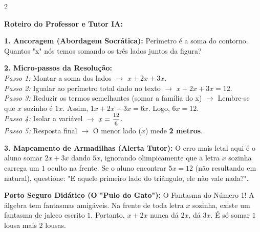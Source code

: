 \begin{multicols*}{2}
\ifgabarito
    \begin{tcolorbox}[colback=CorTitUm!5, colframe=CorTitUm, boxrule=1pt, arc=4pt, left=6pt, right=6pt, top=6pt, bottom=6pt]
    \small\textbf{\textcolor{CorTitUm}{Roteiro do Professor e Tutor IA:}}\par\vspace{0.1cm}
    \color{CinzaEscuro}
    \textbf{1. Ancoragem (Abordagem Socrática):} Perímetro é a soma do contorno. Quantos "x" nós temos somando os três lados juntos da figura?\par\vspace{0.1cm}
    
    \textbf{2. Micro-passos da Resolução:}\\
    \textit{Passo 1:} Montar a soma dos lados $\rightarrow$ $ x + 2x + 3x $.\\
    \textit{Passo 2:} Igualar ao perímetro total dado no texto $\rightarrow$ $ x + 2x + 3x = 12 $.\\
    \textit{Passo 3:} Reduzir os termos semelhantes (somar a família do x) $\rightarrow$ Lembre-se que $x$ sozinho é $1x$. Assim, $1x + 2x + 3x = 6x$. Logo, $ 6x = 12 $.\\
    \textit{Passo 4:} Isolar a variável $\rightarrow$ $ x = \mfrac{12}{6} $.\\
    \textit{Passo 5:} Resposta final $\rightarrow$ O menor lado ($x$) mede \textbf{2 metros}.\par\vspace{0.1cm}
    
    \textbf{3. Mapeamento de Armadilhas (Alerta Tutor):} O erro mais letal aqui é o aluno somar $2x + 3x$ dando $5x$, ignorando olimpicamente que a letra $x$ sozinha carrega um $1$ oculto na frente. Se o aluno encontrar $5x=12$ (não resultando em natural), questione: "E aquele primeiro lado do triângulo, ele não vale nada?".
    \end{tcolorbox}
    \vspace{0.15cm}
    
    \begin{boxexplicacao}
    \textbf{Porto Seguro Didático (O "Pulo do Gato"):} O Fantasma do Número 1! A álgebra tem fantasmas amigáveis. Na frente de toda letra $x$ sozinha, existe um fantasma de jaleco escrito $1$. Portanto, $x+2x$ nunca dá $2x$, dá $3x$. É só somar $1$ lousa mais $2$ lousas.
    \end{boxexplicacao}
\fi


\end{multicols*}
